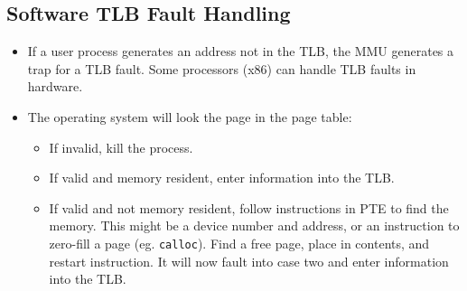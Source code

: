 \documentclass[12pt]{article}
\begin{document}
\subsection{Software TLB Fault Handling}
\begin{itemize}
	\item If a user process generates an address not in the TLB, the MMU generates a trap for a TLB fault. Some processors (x86) can handle TLB faults in hardware.
	\item The operating system will look the page in the page table:
		\begin{itemize}
			\item If invalid, kill the process. 
			\item If valid and memory resident, enter information into the TLB. 
			\item If valid and not memory resident, follow instructions in PTE to find the memory. This might be a device number and address, or an instruction to zero-fill a page (eg. \texttt{calloc}). Find a free page, place in contents, and restart instruction. It will now fault into case two and enter information into the TLB.
		\end{itemize}
\end{itemize}
\end{document}
